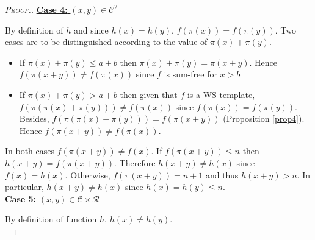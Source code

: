 \begin{proof}[\textsc{Proof.}]
\noindent \underline{\textbf{Case 4:} \((x,y) \in \mathcal{C}^2\)}
\par
By definition of \(h\) and since \(h(x)=h(y)\), \(f(\pi(x)) = f(\pi(y))\). Two cases are to be distinguished according
to the value of \(\pi(x)+\pi(y)\).
\begin{itemize}
\item If \(\pi(x) + \pi(y) \leqslant a+b\) then \(\pi(x)+\pi(y) = \pi(x + y)\). Hence \(f(\pi(x + y)) \neq f(\pi(x))\) since
	\(f\) is sum-free for \(x>b\)
\item \begin{sloppypar}
	If \(\pi(x)+\pi(y)>a+b\) then given that \(f\) is a WS-template, \({f(\pi(\pi(x)+\pi(y))) \neq f(\pi(x))}\) since
	\({f(\pi(x)) = f(\pi(y))}\). Besides,  \({f(\pi(\pi(x)+\pi(y))) = f(\pi(x + y))}\) (Proposition \ref{prop4}). Hence \({f(\pi(x + y))
	\neq  f(\pi(x))}\).
	\end{sloppypar}
\end{itemize}
\par
In both cases \(f(\pi(x+y)) \neq f(x)\). If  \(f(\pi(x+y)) \leqslant n\) then \(h(x+y) = f(\pi(x+y))\). Therefore
\(h(x+y) \neq h(x)\) since \(f(x) = h(x)\). Otherwise, \(f(\pi(x+y)) = n + 1\) and thus \(h(x+y) > n\). In particular,
\(h(x + y) \neq h(x)\) since \(h(x) = h(y) \leqslant n\). \\

\noindent \underline{\textbf{Case 5:} \((x,y) \in \mathcal{C} \times \mathcal{R}\)}
\par
By definition of function \(h\), \(h(x) \neq h(y)\).\\


\end{proof}
